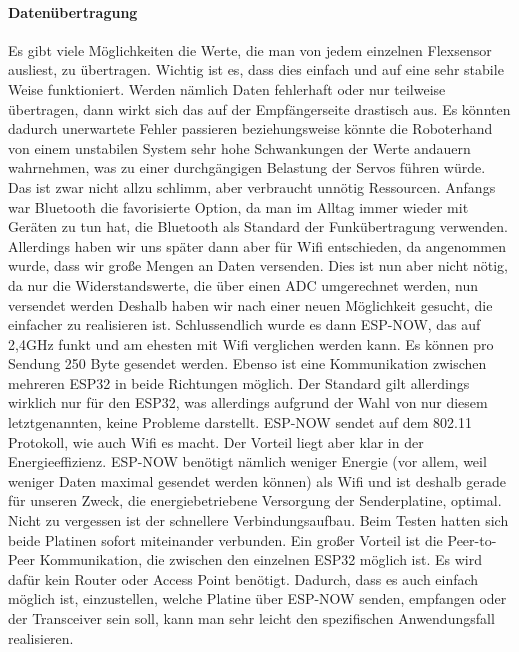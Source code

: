 \documentclass[titlepage,12pt,twoside]{article}
\begin{document}
\paragraph{Datenübertragung}
\hfill \break
\hfill \break
Es gibt viele Möglichkeiten die Werte, die man von jedem einzelnen Flexsensor ausliest, zu übertragen. Wichtig ist es, dass 
dies einfach und auf eine sehr stabile Weise funktioniert. Werden nämlich Daten fehlerhaft oder nur teilweise übertragen, dann 
wirkt sich das auf der Empfängerseite drastisch aus. Es könnten dadurch unerwartete Fehler passieren beziehungsweise könnte die 
Roboterhand von einem unstabilen System sehr hohe Schwankungen der Werte andauern wahrnehmen, was zu einer durchgängigen 
Belastung der Servos führen würde. Das ist zwar nicht allzu schlimm, aber verbraucht unnötig Ressourcen. Anfangs war Bluetooth 
die favorisierte Option, da man im Alltag immer wieder mit Geräten zu tun hat, die Bluetooth als Standard der Funkübertragung 
verwenden. Allerdings haben wir uns später dann aber für Wifi entschieden, da angenommen wurde, dass wir große Mengen an Daten 
versenden. Dies ist nun aber nicht nötig, da nur die Widerstandswerte, die über einen ADC umgerechnet werden, nun versendet 
werden Deshalb haben wir nach einer neuen Möglichkeit gesucht, die einfacher zu realisieren ist. Schlussendlich wurde es dann 
ESP-NOW, das auf 2,4GHz funkt und am ehesten mit Wifi verglichen werden kann. Es können pro Sendung 250 Byte gesendet werden. 
Ebenso ist eine Kommunikation zwischen mehreren ESP32 in beide Richtungen möglich. Der Standard gilt allerdings wirklich nur 
für den ESP32, was allerdings aufgrund der Wahl von nur diesem letztgenannten, keine Probleme darstellt. ESP-NOW sendet auf dem 
802.11 Protokoll, wie auch Wifi es macht. Der Vorteil liegt aber klar in der Energieeffizienz. ESP-NOW benötigt nämlich weniger 
Energie (vor allem, weil weniger Daten maximal gesendet werden können) als Wifi und ist deshalb gerade für unseren Zweck, die 
energiebetriebene Versorgung der Senderplatine, optimal. Nicht zu vergessen ist der schnellere Verbindungsaufbau. Beim Testen 
hatten sich beide Platinen sofort miteinander verbunden. Ein großer Vorteil ist die Peer-to-Peer Kommunikation, die zwischen 
den einzelnen ESP32 möglich ist. Es wird dafür kein Router oder Access Point benötigt. Dadurch, dass es auch einfach möglich 
ist, einzustellen, welche Platine über ESP-NOW senden, empfangen oder der Transceiver sein soll, kann man sehr leicht den 
spezifischen Anwendungsfall realisieren. \\
\\
\end{document}
